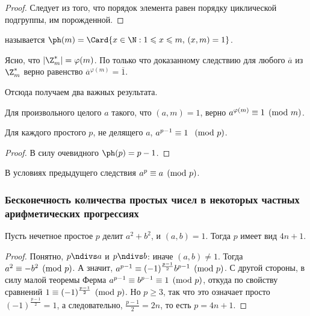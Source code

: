\begin{proof}
Следует из того, что порядок элемента равен порядку циклической подгруппы, им
порожденной.
\end{proof}

\begin{df}
 называется 
$\ph(m) = \Card\{x\in\N: 1 \leqslant x \leqslant m,\, (x,m)=1\}$.
\end{df}

Ясно, что $|\Z_m^*| = \varphi(m)$. 
По только что доказанному следствию для любого
$\overline{a}$ из $\Z_m^*$ верно равенство $\overline{a}^{\varphi(m)} 
= \overline{1}$.

Отсюда получаем два важных результата.
\begin{imp}
  Для произвольного целого $a$ такого, что $(a,m) =1$, верно $a^{\varphi(m)} 
	\equiv 1 \pmod m$.
\end{imp}

\begin{imp}
  Для каждого простого $p$, не делящего $a$, $a^{p-1} \equiv 1~\pmod p$.
\end{imp}

\begin{proof}
  В силу очевидного $\ph(p)=p-1$.
\end{proof}

\begin{imp}
В условиях предыдущего следствия $a^p\equiv a\pmod p$.
\end{imp}

\subsubsection{Бесконечность количества простых чисел в некоторых частных 
							арифметических прогрессиях}

\begin{lemma}
	\label{p divs a^2+b^2}
  Пусть нечетное простое $p$ делит $a^2 + b^2$, и $(a,b) = 1$. Тогда $p$ имеет 
	вид $4n + 1$.
\end{lemma}

\begin{proof}
  Понятно, $p \ndivs a$ и $p \ndivs b$: иначе $(a,b) \not = 1$. Тогда 
	$a^2 \equiv -b^2 \pmod p$. А значит, $a^{p-1} \equiv (-1)^{\frac{p-1}{2}} b^{p-1} 
	\pmod p$. С другой стороны, в силу малой теоремы Ферма 
	$a^{p-1}\equiv b^{p-1}\equiv1\pmod p$, откуда по свойству  сравнений 
	$1 \equiv (-1)^{\frac{p-1}{2}} \pmod p$. Но $p\geqslant 3$, 
	так что это означает просто $(-1)^{\frac{p-1}{2}} = 1$, а следовательно, 
	$\frac{p-1}{2} = 2n$, то есть $p = 4n + 1$.
\end{proof}

